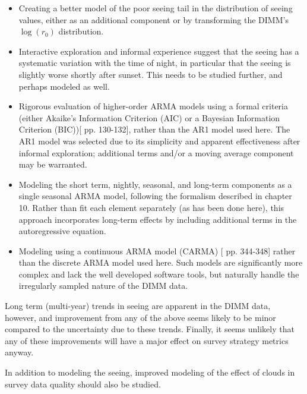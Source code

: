 \documentclass[DM,authoryear,toc]{lsstdoc}
\begin{document}
\begin{itemize}

\item Creating a better model of the poor seeing tail in the
  distribution of seeing values, either as an additional component or
  by transforming the DIMM's $\log(r_0)$ distribution.

\item Interactive exploration and informal experience suggest that the
  seeing has a systematic variation with the time of night, in
  particular that the seeing is slightly worse shortly after
  sunset. This needs to be studied further, and perhaps modeled as
  well.

\item Rigorous evaluation of higher-order ARMA models using a formal
  criteria (either Akaike's Information Criterion (AIC) or a Bayesian
  Information Criterion (BIC))[\cite{cryer_time_2008} pp. 130-132],
  rather than the AR1 model used here. The AR1 model was selected due
  to its simplicity and apparent effectiveness after informal
  exploration; additional terms and/or a moving average component may
  be warranted.

\item Modeling the short term, nightly, seasonal, and long-term
  components as a single seasonal ARMA model, following the formalism
  described in \cite{cryer_time_2008} chapter 10. Rather than fit each
  element separately (as has been done here), this approach
  incorporates long-term effects by including additional terms in the
  autoregressive equation.
  
\item Modeling using a continuous ARMA model (CARMA)
  [\cite{brockwell_introduction_1996} pp. 344-348] rather than the
  discrete ARMA model used here. Such models are significantly more
  complex and lack the well developed software tools, but naturally
  handle the irregularly sampled nature of the DIMM data.
  
\end{itemize}

Long term (multi-year) trends in seeing are apparent in the DIMM data,
however, and improvement from any of the above seems likely to be
minor compared to the uncertainty due to these trends. Finally, it
seems unlikely that any of these improvements will have a major effect
on survey strategy metrics anyway.

In addition to modeling the seeing, improved modeling of the effect of
clouds in survey data quality should also be studied.
\end{document}
